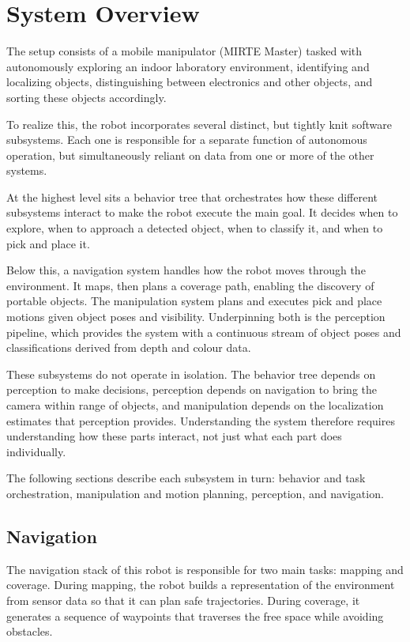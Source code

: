 \section{System Overview}

The setup consists of a mobile manipulator (MIRTE Master) tasked with autonomously exploring an indoor laboratory environment, identifying and localizing objects, distinguishing between electronics and other objects, and sorting these objects accordingly.

To realize this, the robot incorporates several distinct, but tightly knit software subsystems. Each one is responsible for a separate function of autonomous operation, but simultaneously reliant on data from one or more of the other systems.

At the highest level sits a behavior tree that orchestrates how these different subsystems interact to make the robot execute the main goal. It decides when to explore, when to approach a detected object, when to classify it, and when to pick and place it.

Below this, a navigation system handles how the robot moves through the environment. It maps, then plans a coverage path, enabling the discovery of portable objects. The manipulation system plans and executes pick and place motions given object poses and visibility. Underpinning both is the perception pipeline, which provides the system with a continuous stream of object poses and classifications derived from depth and colour data.

These subsystems do not operate in isolation. The behavior tree depends on perception to make decisions, perception depends on navigation to bring the camera within range of objects, and manipulation depends on the localization estimates that perception provides. Understanding the system therefore requires understanding how these parts interact, not just what each part does individually.

The following sections describe each subsystem in turn: behavior and task orchestration, manipulation and motion planning, perception, and navigation.
    \subsection{Navigation}

    The navigation stack of this robot is responsible for two main tasks: mapping and coverage. During mapping, the robot builds a representation of the environment from sensor data so that it can plan safe trajectories. During coverage, it generates a sequence of waypoints that traverses the free space while avoiding obstacles.

